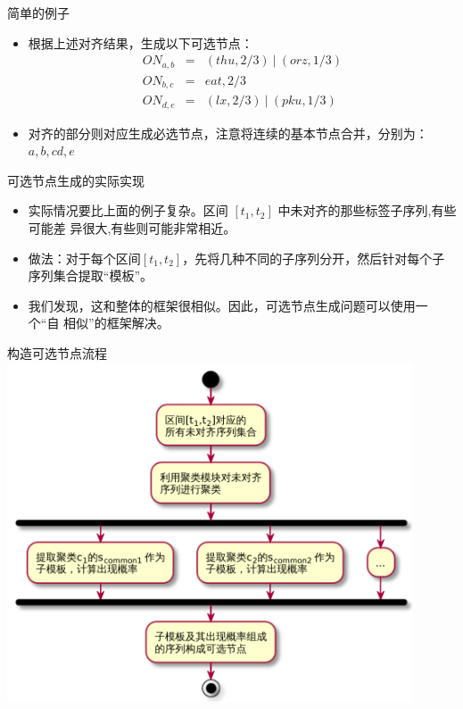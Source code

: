 \begin{frame}[label=sec-2-20]{简单的例子}
\begin{itemize}
\item 根据上述对齐结果，生成以下可选节点：
\begin{eqnarray*}
ON_{a,b}&=&(thu,2/3)~|~(orz,1/3)\\
ON_{b,c}&=&eat,2/3\\
ON_{d,e}&=&(lx,2/3)~|~(pku,1/3)
\end{eqnarray*}
\item 对齐的部分则对应生成必选节点，注意将连续的基本节点合并，分别为： $a,b,cd,e$
\end{itemize}
\end{frame}

\begin{frame}[label=sec-2-21]{可选节点生成的实际实现}
\begin{itemize}
\item 实际情况要比上面的例子复杂。区间 $[t_1,t_2]$ 中未对齐的那些标签子序列,有些可能差
异很大,有些则可能非常相近。
\item<2-> 做法：对于每个区间$[t_1,t_2]$，先将几种不同的子序列分开，然后针对每个子序列集合提取“模板”。
\item<3-> 我们发现，这和整体的框架很相似。因此，可选节点生成问题可以使用一个“自
  相似”的框架解决。
\end{itemize}
\end{frame}

\begin{frame}[label=sec-2-22]{构造可选节点流程}
\includegraphics[width=0.9\textwidth]{subtemplate}
\end{frame}

